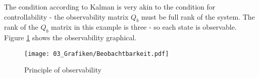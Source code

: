 The condition according to Kalman is very akin to the condition for controllability - the observability matrix $Q_b$  must be full rank of the system. The rank of the $Q_b$ matrix in this example is three - so each state is observable. Figure \ref{fig:Beobachtbarkeit} shows the observability graphical.

\begin{figure}
	\centering
		\texttt{[image: 03\_Grafiken/Beobachtbarkeit.pdf]}
	\caption{Principle of observability}
	\label{fig:Beobachtbarkeit}
\end{figure}


